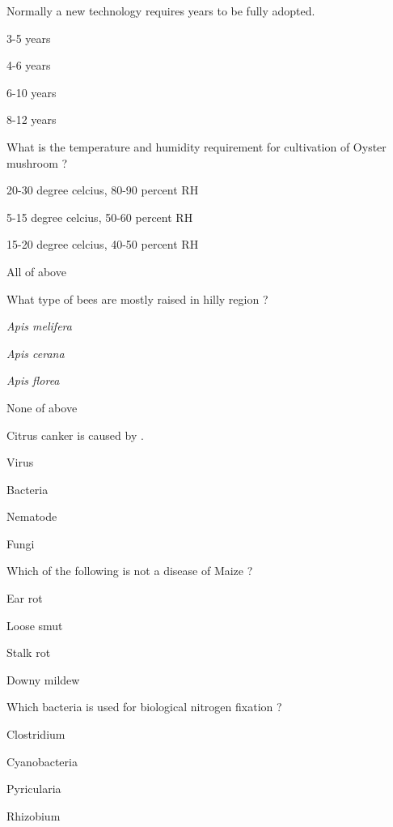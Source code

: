 \begin{questions}
\question Normally a new technology requires \fillin[][3cm] years to be fully adopted.
\begin{items}
\item 3-5 years
\item 4-6 years
\item* 6-10 years
\item 8-12 years
\end{items}

\question What is the temperature and humidity requirement for cultivation of Oyster mushroom ?
\begin{items}
\item* 20-30 degree celcius, 80-90 percent RH
\item 5-15 degree celcius, 50-60 percent RH
\item 15-20 degree celcius, 40-50 percent RH
\item All of above
\end{items}

\question What type of bees are mostly raised in hilly region ?
\begin{items}
\item \textit{Apis melifera}
\item* \textit{Apis cerana}
\item \textit{Apis florea}
\item None of above
\end{items}

\question Citrus canker is caused by \fillin[][3cm].
\begin{items}
\item Virus
\item* Bacteria
\item Nematode
\item Fungi
\end{items}

\question Which of the following is not a disease of Maize ?
\begin{items}
\item Ear rot
\item* Loose smut
\item Stalk rot
\item Downy mildew
\end{items}

\question Which bacteria is used for biological nitrogen fixation ?
\begin{items}
\item Clostridium
\item Cyanobacteria
\item Pyricularia
\item* Rhizobium
\end{items}


\end{questions}

